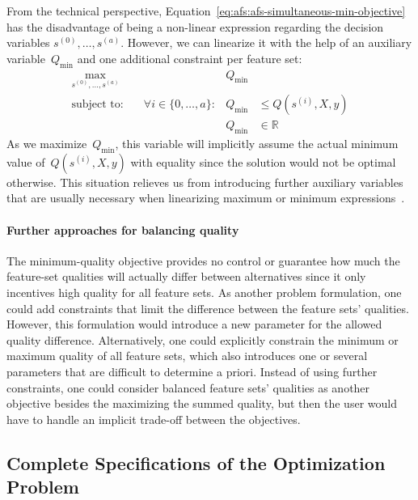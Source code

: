 \documentclass{article}
\theoremstyle{definition}
\begin{document}
From the technical perspective, Equation~\ref{eq:afs:afs-simultaneous-min-objective} has the disadvantage of being a non-linear expression regarding the decision variables $s^{(0)}, \dots, s^{(a)}$.
However, we can linearize it with the help of an auxiliary variable~$Q_{\text{min}}$ and one additional constraint per feature set:
%
\begin{equation}
	\begin{aligned}
		\max_{s^{(0)}, \dots, s^{(a)}} &\quad &Q_{\text{min}} & \\
		\text{subject to:} &\quad \forall i \in \{0, \dots, a\}: &Q_{\text{min}} &\leq Q(s^{(i)},X,y) \\
		&\quad & Q_{\text{min}} &\in \mathbb{R}
	\end{aligned}
	\label{eq:afs:afs-simultaneous-min-objective-linear}
\end{equation}
%
As we maximize~$Q_{\text{min}}$, this variable will implicitly assume the actual minimum value of~$Q(s^{(i)},X,y)$ with equality since the solution would not be optimal otherwise.
This situation relieves us from introducing further auxiliary variables that are usually necessary when linearizing maximum or minimum expressions~\cite{mosek2022modeling}.

\paragraph{Further approaches for balancing quality}

The minimum-quality objective provides no control or guarantee how much the feature-set qualities will actually differ between alternatives since it only incentives high quality for all feature sets.
As another problem formulation, one could add constraints that limit the difference between the feature sets' qualities.
However, this formulation would introduce a new parameter for the allowed quality difference.
Alternatively, one could explicitly constrain the minimum or maximum quality of all feature sets, which also introduces one or several parameters that are difficult to determine a priori.
Instead of using further constraints, one could consider balanced feature sets' qualities as another objective besides the maximizing the summed quality, but then the user would have to handle an implicit trade-off between the objectives.

\subsection{Complete Specifications of the Optimization Problem}
\label{sec:afs:appendix:complete-optimization-problem}
\end{document}
